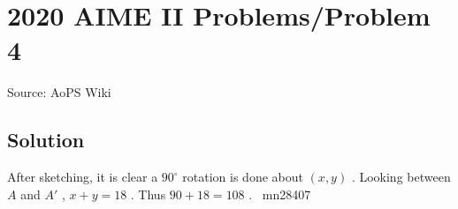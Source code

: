 \documentclass[12pt]{article}
\begin{document}
\section*{{2020 AIME II Problems/Problem 4}}
Source: AoPS Wiki

\subsection*{Solution}
After sketching, it is clear a $90^{\circ}$ rotation is done about $(x,y)$ . Looking between $A$ and $A'$ , $x+y=18$ . Thus $90+18=\boxed{108}$ .
~mn28407
\end{document}
